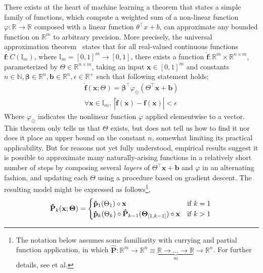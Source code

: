 \documentclass[12pt,initial,twoside,maitrise]{dms}
\numberwithin{equation}{section}
\numberwithin{table}{chapter}
\numberwithin{figure}{chapter}
\begin{document}
There exists at the heart of machine learning a theorem that states a simple family of functions, which compute a weighted sum of a non-linear function $\varphi: \mathbb{R} \rightarrow \mathbb{R}$ composed with a linear function $\theta^\intercal x + b$, can approximate any bounded function on $\mathbb{R}^m$ to arbitrary precision. More precisely, the universal approximation theorem~\citep{hornik1989multilayer} states that for all real-valued continuous functions $\mathbf{f}: C(\mathbb{I}_m)$, where $\mathbb{I}_m = [0, 1]^m \rightarrow [0, 1]$, there exists a function $\mathbf{\hat f}: \mathbb{R}^m \times \mathbb{R}^{n \times m}$, parameterized by $\Theta \in \mathbb{R}^{n \times m}$, taking an input $\mathbf x \in [0, 1]^m$ and constants $n \in \mathbb{N}, \mathbf{\beta} \in \mathbb{R}^n, \mathbf{b} \in \mathbb{R}^n, \epsilon \in \mathbb{R}^+$ such that following statement holds:
%
\begin{equation}
    \begin{split}
        \mathbf{\hat{f}}(\mathbf{x}; \Theta) = \mathbf{\beta}^\intercal \varphi_{\odot} \left(\Theta^\intercal \mathbf{x} + \mathbf{b}\right) \\
        \forall \mathbf{x} \in \mathbb{I}_m, \ | \mathbf{\hat f}( \mathbf{x} ) - \mathbf{f} ( \mathbf{x} ) | < \epsilon
    \end{split}
\end{equation}
%
Where $\varphi_{\odot}$ indicates the nonlinear function $\varphi$ applied elementwise to a vector. This theorem only tells us that $\Theta$ exists, but does not tell us how to find it nor does it place an upper bound on the constant $n$, somewhat limiting its practical applicability. But for reasons not yet fully understood, empirical results suggest it is possible to approximate many naturally-arising functions in a relatively short number of steps by composing several \textit{layers} of $\Theta^\intercal \mathbf{x} + \mathbf{b}$ and $\varphi$ in an alternating fashion, and updating each $\Theta$ using a procedure based on gradient descent. The resulting model might be expressed as follows\footnote{The notation below assumes some familiarity with currying and partial function application, in which $\mathbf{\hat P}: \mathbb{R}^m \rightarrow \mathbb{R}^n \equiv \underbrace{\mathbb R \rightarrow \ldots \rightarrow \mathbb R}_{m}\rightarrow \mathbb{R}^n$. For further details, see \citet{schonfinkel1924bausteine, curry1958combinatory} et al.},
%
\begin{equation} \label{eq:recursive_parametric_eq}
    \mathbf{\hat P}_k(\mathbf{x}; \mathbf{\Theta}) = \begin{cases} \mathbf{\hat p}_1(\Theta_1)\circ\mathbf{x} &\text{if } k=1\\ \mathbf{\hat p}_k(\Theta_k)\circ \mathbf{\hat P}_{k-1}(\mathbf{\Theta}_{[1, k-1]})\circ\mathbf{x}&\text{if } k > 1 \end{cases} \\
\end{equation}
\end{document}

